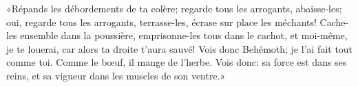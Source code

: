 «Répands les débordements de ta colère; regarde tous les arrogants, abaisse-les;
	oui, regarde tous les arrogants, terrasse-les, écrase sur place les méchants!
Cache-les ensemble dans la poussière, emprisonne-les tous dans le cachot,
	et moi-même, je te louerai, car alors ta droite t’aura sauvé!
Vois donc Behémoth; je l’ai fait tout comme toi.
	Comme le bœuf, il mange de l’herbe.
Vois donc: sa force est dans ses reins,
	et sa vigueur dans les muscles de son ventre.»
